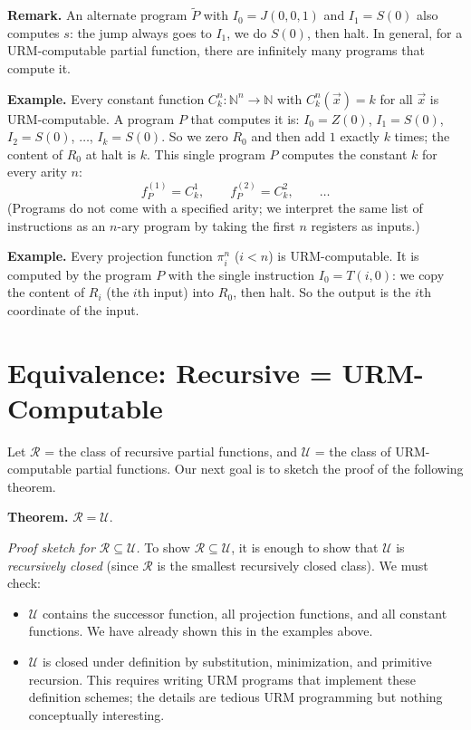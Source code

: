 \documentclass[11pt]{article}
\begin{document}
\textbf{Remark.} An alternate program $\widetilde{P}$ with $I_0 = J(0, 0, 1)$ and $I_1 = S(0)$ also computes $s$: the jump always goes to $I_1$, we do $S(0)$, then halt. In general, for a URM-computable partial function, there are infinitely many programs that compute it.

\textbf{Example.} Every constant function $C_k^n\colon \mathbb{N}^n \to \mathbb{N}$ with $C_k^n(\vec{x}) = k$ for all $\vec{x}$ is URM-computable. A program $P$ that computes it is: $I_0 = Z(0)$, $I_1 = S(0)$, $I_2 = S(0)$, $\dots$, $I_k = S(0)$. So we zero $R_0$ and then add $1$ exactly $k$ times; the content of $R_0$ at halt is $k$. This single program $P$ computes the constant $k$ for every arity $n$:
\[
    f_P^{(1)} = C_k^1,\qquad f_P^{(2)} = C_k^2,\qquad \dots
\]
(Programs do not come with a specified arity; we interpret the same list of instructions as an $n$-ary program by taking the first $n$ registers as inputs.)

\textbf{Example.} Every projection function $\pi^n_i$ ($i < n$) is URM-computable. It is computed by the program $P$ with the single instruction $I_0 = T(i, 0)$: we copy the content of $R_i$ (the $i$th input) into $R_0$, then halt. So the output is the $i$th coordinate of the input.

\section{Equivalence: Recursive = URM-Computable}

Let $\mathcal{R}$ = the class of recursive partial functions, and $\mathcal{U}$ = the class of URM-computable partial functions. Our next goal is to sketch the proof of the following theorem.

\textbf{Theorem.} $\mathcal{R} = \mathcal{U}$.

\textit{Proof sketch for $\mathcal{R} \subseteq \mathcal{U}$.} To show $\mathcal{R} \subseteq \mathcal{U}$, it is enough to show that $\mathcal{U}$ is \emph{recursively closed} (since $\mathcal{R}$ is the smallest recursively closed class). We must check:

\begin{itemize}[leftmargin=1.6em]
    \item $\mathcal{U}$ contains the successor function, all projection functions, and all constant functions. We have already shown this in the examples above.
    \item $\mathcal{U}$ is closed under definition by substitution, minimization, and primitive recursion. This requires writing URM programs that implement these definition schemes; the details are tedious URM programming but nothing conceptually interesting.
\end{itemize}
\end{document}
